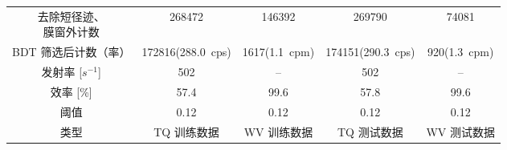 \begin{table}[!htbp]
{\begin{tabular}{c c c c c}
    \makecell[c]{去除短径迹、\\膜窗外计数}  &   268472                  &   146392   &  269790  &   74081   \\
    BDT 筛选后计数（率）    &   172816(\SI{288.0}{cps})          &   1617(\SI{1.1}{cpm})    &   174151(\SI{290.3}{cps}) &   920(\SI{1.3}{cpm})  \\
    发射率 [$s^{-1}$]       &   502                      &   --  & 502    &   --  \\
    效率 [\%]               &   57.4                      &   99.6  &   57.8    &   99.6    \\
    阈值                    &   0.12                    &   0.12    &   0.12    &   0.12    \\
    类型                    &   TQ 训练数据             &   WV 训练数据 &   TQ 测试数据 &   WV 测试数据 \\
    \bottomrule
    \end{tabular}
}
\end{table}

